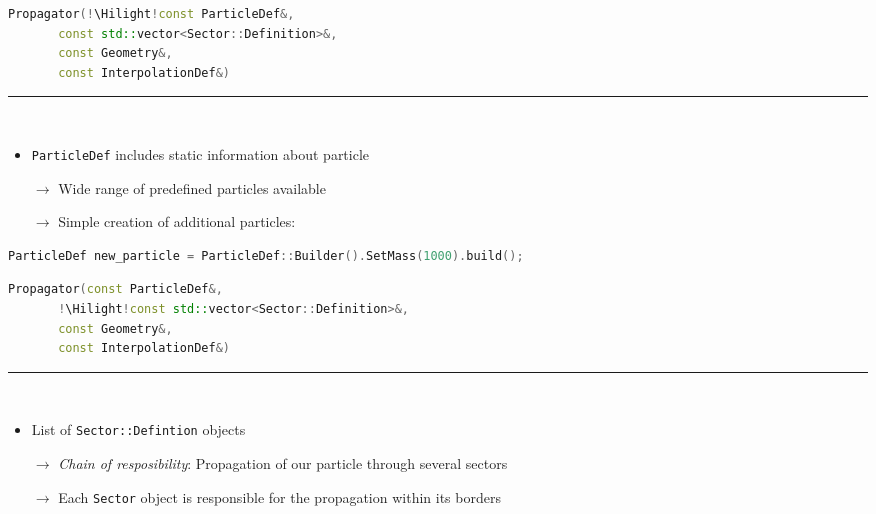 \documentclass[aspectratio=1610, captions=tableheading, 11pt]{beamer}
\newcommand{\Hilight}{\makebox[0pt][l]{\color{tugreen}\rule[-4pt]{0.65\linewidth}{14pt}}}
\begin{document}
\begin{frame}[fragile]
\begin{lstlisting}[language=C++,basicstyle=\ttfamily,keywordstyle=\color{red}, escapechar=\!]
Propagator(!\Hilight!const ParticleDef&,
	   const std::vector<Sector::Definition>&,
	   const Geometry&,
	   const InterpolationDef&)
\end{lstlisting}
	\textcolor{tugreen}{\rule{\textwidth}{1pt}}\\%
    \begin{itemize}
      \setlength\itemsep{0.5em}
      \item \texttt{ParticleDef} includes static information about particle
      \item [$\rightarrow$] Wide range of predefined particles available 
      \item [$\rightarrow$] Simple creation of additional particles:
    \end{itemize}
\begin{lstlisting}[language=C++,basicstyle=\ttfamily,keywordstyle=\color{red}, escapechar=\!]
    ParticleDef new_particle = ParticleDef::Builder().SetMass(1000).build();
\end{lstlisting}
\end{frame}


\begin{frame}[fragile]
\begin{lstlisting}[language=C++,basicstyle=\ttfamily,keywordstyle=\color{red}, escapechar=\!]
Propagator(const ParticleDef&,
	   !\Hilight!const std::vector<Sector::Definition>&,
	   const Geometry&,
	   const InterpolationDef&)
\end{lstlisting}
	\textcolor{tugreen}{\rule{\textwidth}{1pt}}\\%
    \begin{itemize}
      \setlength\itemsep{0.5em}
      \item List of \texttt{Sector::Defintion} objects
      \item [$\rightarrow$] \emph{Chain of resposibility}: Propagation of our particle through several sectors
      \item [$\rightarrow$] Each \texttt{Sector} object is responsible for the propagation within its borders
    \end{itemize}
\end{frame}
\end{document}
